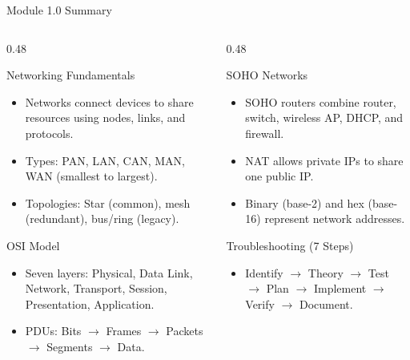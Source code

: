 \documentclass[aspectratio=169]{beamer}  %
\begin{document}
\begin{frame}{Module 1.0 Summary}
    \begin{columns}[T]
        \begin{column}{0.48\textwidth}
            \begin{block}{Networking Fundamentals}
                \begin{itemize}
                    \item Networks connect devices to share resources using nodes, links, and protocols.
                    \item Types: PAN, LAN, CAN, MAN, WAN (smallest to largest).
                    \item Topologies: Star (common), mesh (redundant), bus/ring (legacy).
                \end{itemize}
            \end{block}
            
            \vspace{0.3em}
            \begin{block}{OSI Model}
                \begin{itemize}
                    \item Seven layers: Physical, Data Link, Network, Transport, Session, Presentation, Application.
                    \item PDUs: Bits $\rightarrow$ Frames $\rightarrow$ Packets $\rightarrow$ Segments $\rightarrow$ Data.
                \end{itemize}
            \end{block}
        \end{column}
        \begin{column}{0.48\textwidth}
            \begin{block}{SOHO Networks}
                \begin{itemize}
                    \item SOHO routers combine router, switch, wireless AP, DHCP, and firewall.
                    \item NAT allows private IPs to share one public IP.
                    \item Binary (base-2) and hex (base-16) represent network addresses.
                \end{itemize}
            \end{block}
            
            \vspace{0.3em}
            \begin{block}{Troubleshooting (7 Steps)}
                \begin{itemize}
                    \item Identify $\rightarrow$ Theory $\rightarrow$ Test $\rightarrow$ Plan $\rightarrow$ Implement $\rightarrow$ Verify $\rightarrow$ Document.
                \end{itemize}
            \end{block}
        \end{column}
    \end{columns}
    

\end{frame}
\end{document}
